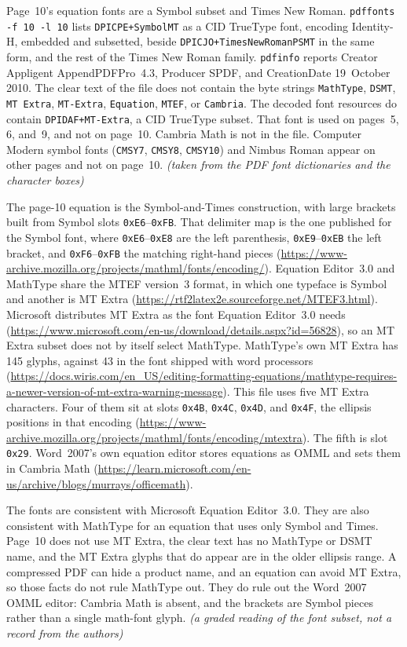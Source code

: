 \documentclass[11pt]{article}
\newcommand{\ev}[1]{\textup{\emph{(#1)}}}
\begin{document}
Page~10's equation fonts are a Symbol subset and Times New Roman.
\texttt{pdffonts -f 10 -l 10} lists \texttt{DPICPE+SymbolMT} as a CID
TrueType font, encoding Identity-H, embedded and subsetted, beside
\texttt{DPICJO+TimesNewRomanPSMT} in the same form, and the rest of the
Times New Roman family. \texttt{pdfinfo} reports Creator Appligent
AppendPDFPro~4.3, Producer SPDF, and CreationDate 19~October 2010.
The clear text of the file does not contain the byte strings
\texttt{MathType}, \texttt{DSMT}, \texttt{MT Extra}, \texttt{MT-Extra},
\texttt{Equation}, \texttt{MTEF}, or \texttt{Cambria}. The decoded font
resources do contain \texttt{DPIDAF+MT-Extra}, a CID TrueType subset.
That font is used on pages~5, 6, and~9, and not on page~10. Cambria Math
is not in the file. Computer Modern symbol fonts (\texttt{CMSY7},
\texttt{CMSY8}, \texttt{CMSY10}) and Nimbus Roman appear on other pages
and not on page~10.
\ev{taken from the PDF font dictionaries and the character boxes}

The page-10 equation is the Symbol-and-Times construction, with large
brackets built from Symbol slots \texttt{0xE6}--\texttt{0xFB}. That
delimiter map is the one published for the Symbol font, where
\texttt{0xE6}--\texttt{0xE8} are the left parenthesis, \texttt{0xE9}--\texttt{0xEB}
the left bracket, and \texttt{0xF6}--\texttt{0xFB} the matching right-hand
pieces
(\url{https://www-archive.mozilla.org/projects/mathml/fonts/encoding/}).
Equation Editor~3.0 and MathType share the MTEF version~3 format, in which
one typeface is Symbol and another is MT Extra
(\url{https://rtf2latex2e.sourceforge.net/MTEF3.html}).
Microsoft distributes MT Extra as the font Equation Editor~3.0 needs
(\url{https://www.microsoft.com/en-us/download/details.aspx?id=56828}),
so an MT Extra subset does not by itself select MathType. MathType's own
MT Extra has 145 glyphs, against 43 in the font shipped with word
processors
(\url{https://docs.wiris.com/en_US/editing-formatting-equations/mathtype-requires-a-newer-version-of-mt-extra-warning-message}).
This file uses five MT Extra characters. Four of them sit at slots
\texttt{0x4B}, \texttt{0x4C}, \texttt{0x4D}, and \texttt{0x4F}, the
ellipsis positions in that encoding
(\url{https://www-archive.mozilla.org/projects/mathml/fonts/encoding/mtextra}).
The fifth is slot \texttt{0x29}. Word~2007's own equation editor stores
equations as OMML and sets them in Cambria Math
(\url{https://learn.microsoft.com/en-us/archive/blogs/murrays/officemath}).

The fonts are consistent with Microsoft Equation Editor~3.0. They are also
consistent with MathType for an equation that uses only Symbol and Times.
Page~10 does not use MT Extra, the clear text has no MathType or DSMT name,
and the MT Extra glyphs that do appear are in the older ellipsis range.
A compressed PDF can hide a product name, and an equation can avoid
MT Extra, so those facts do not rule MathType out. They do rule out the
Word~2007 OMML editor: Cambria Math is absent, and the brackets are Symbol
pieces rather than a single math-font glyph.
\ev{a graded reading of the font subset, not a record from the authors}
\end{document}
